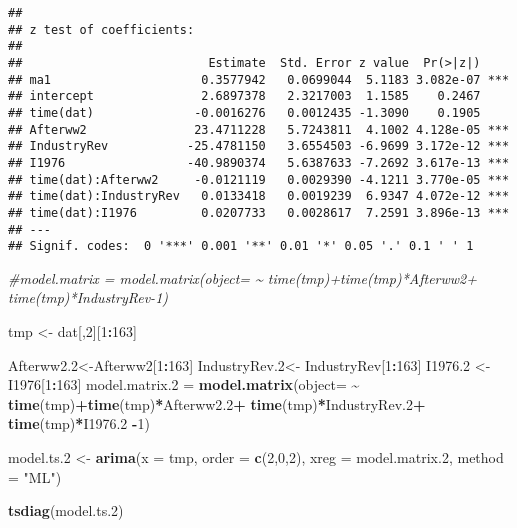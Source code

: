 \documentclass[
]{article}
\newenvironment{Shaded}{\begin{snugshade}}{\end{snugshade}}
\newcommand{\AttributeTok}[1]{\textcolor[rgb]{0.13,0.29,0.53}{#1}}
\newcommand{\CommentTok}[1]{\textcolor[rgb]{0.56,0.35,0.01}{\textit{#1}}}
\newcommand{\DecValTok}[1]{\textcolor[rgb]{0.00,0.00,0.81}{#1}}
\newcommand{\FloatTok}[1]{\textcolor[rgb]{0.00,0.00,0.81}{#1}}
\newcommand{\FunctionTok}[1]{\textcolor[rgb]{0.13,0.29,0.53}{\textbf{#1}}}
\newcommand{\NormalTok}[1]{#1}
\newcommand{\OtherTok}[1]{\textcolor[rgb]{0.56,0.35,0.01}{#1}}
\newcommand{\SpecialCharTok}[1]{\textcolor[rgb]{0.81,0.36,0.00}{\textbf{#1}}}
\newcommand{\StringTok}[1]{\textcolor[rgb]{0.31,0.60,0.02}{#1}}
\begin{document}
\begin{verbatim}
## 
## z test of coefficients:
## 
##                          Estimate  Std. Error z value  Pr(>|z|)    
## ma1                     0.3577942   0.0699044  5.1183 3.082e-07 ***
## intercept               2.6897378   2.3217003  1.1585    0.2467    
## time(dat)              -0.0016276   0.0012435 -1.3090    0.1905    
## Afterww2               23.4711228   5.7243811  4.1002 4.128e-05 ***
## IndustryRev           -25.4781150   3.6554503 -6.9699 3.172e-12 ***
## I1976                 -40.9890374   5.6387633 -7.2692 3.617e-13 ***
## time(dat):Afterww2     -0.0121119   0.0029390 -4.1211 3.770e-05 ***
## time(dat):IndustryRev   0.0133418   0.0019239  6.9347 4.072e-12 ***
## time(dat):I1976         0.0207733   0.0028617  7.2591 3.896e-13 ***
## ---
## Signif. codes:  0 '***' 0.001 '**' 0.01 '*' 0.05 '.' 0.1 ' ' 1
\end{verbatim}

\begin{Shaded}
\begin{Highlighting}[]
\CommentTok{\#model.matrix = model.matrix(object= \textasciitilde{} time(tmp)+time(tmp)*Afterww2+ time(tmp)*IndustryRev{-}1)}

\NormalTok{tmp }\OtherTok{\textless{}{-}}\NormalTok{ dat[,}\DecValTok{2}\NormalTok{][}\DecValTok{1}\SpecialCharTok{:}\DecValTok{163}\NormalTok{]}

\NormalTok{Afterww2}\FloatTok{.2}\OtherTok{\textless{}{-}}\NormalTok{Afterww2[}\DecValTok{1}\SpecialCharTok{:}\DecValTok{163}\NormalTok{]}
\NormalTok{IndustryRev}\FloatTok{.2}\OtherTok{\textless{}{-}}\NormalTok{ IndustryRev[}\DecValTok{1}\SpecialCharTok{:}\DecValTok{163}\NormalTok{]}
\NormalTok{I1976}\FloatTok{.2} \OtherTok{\textless{}{-}}\NormalTok{ I1976[}\DecValTok{1}\SpecialCharTok{:}\DecValTok{163}\NormalTok{]}
\NormalTok{model.matrix}\FloatTok{.2} \OtherTok{=} \FunctionTok{model.matrix}\NormalTok{(}\AttributeTok{object=} \SpecialCharTok{\textasciitilde{}} \FunctionTok{time}\NormalTok{(tmp)}\SpecialCharTok{+}\FunctionTok{time}\NormalTok{(tmp)}\SpecialCharTok{*}\NormalTok{Afterww2}\FloatTok{.2}\SpecialCharTok{+} \FunctionTok{time}\NormalTok{(tmp)}\SpecialCharTok{*}\NormalTok{IndustryRev}\FloatTok{.2}\SpecialCharTok{+} \FunctionTok{time}\NormalTok{(tmp)}\SpecialCharTok{*}\NormalTok{I1976}\FloatTok{.2} \SpecialCharTok{{-}}\DecValTok{1}\NormalTok{)}

\NormalTok{model.ts}\FloatTok{.2} \OtherTok{\textless{}{-}} \FunctionTok{arima}\NormalTok{(}\AttributeTok{x =}\NormalTok{ tmp, }\AttributeTok{order =} \FunctionTok{c}\NormalTok{(}\DecValTok{2}\NormalTok{,}\DecValTok{0}\NormalTok{,}\DecValTok{2}\NormalTok{),  }\AttributeTok{xreg =}\NormalTok{ model.matrix}\FloatTok{.2}\NormalTok{, }\AttributeTok{method =} \StringTok{"ML"}\NormalTok{)}

\FunctionTok{tsdiag}\NormalTok{(model.ts}\FloatTok{.2}\NormalTok{)}
\end{Highlighting}
\end{Shaded}
\end{document}
